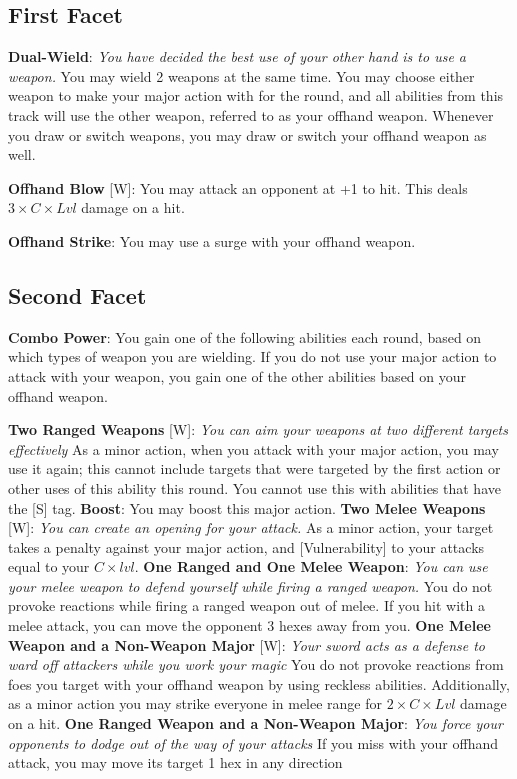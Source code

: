 \begin{multicols*}{2}
\subsection*{First Facet\perk}
\textbf{Dual-Wield}: \emph{You have decided the best use of your other hand is to use a weapon.} You may wield 2 weapons at the same time. You may choose either weapon to make your major action with for the round, and all abilities from this track will use the other weapon, referred to as your offhand weapon.  Whenever you draw or switch weapons, you may draw or switch your offhand weapon as well.

\textbf{Offhand Blow} [W]:  You may attack an opponent at +1 to hit. This deals $3\times C\times Lvl$ damage on a hit.

\textbf{Offhand Strike}: You may use a surge with your offhand weapon. 

\subsection*{Second Facet}
\textbf{Combo Power}: You gain one of the following abilities each round, based on which types of weapon you are wielding. If you do not use your major action to attack with your weapon, you gain one of the other abilities based on your offhand weapon.
\begin{itemize}
\thing \textbf{Two Ranged Weapons} [W]: \emph{You can aim your weapons at two different targets effectively} As a minor action, when you attack with your major action, you may use it again; this cannot include targets that were targeted by the first action or other uses of this ability this round. You cannot use this with abilities that have the [S] tag. \textbf{Boost}: You may boost this major action.
\thing \textbf{Two Melee Weapons} [W]: \emph{You can create an opening for your attack.} As a minor action, your target takes a penalty against your major action, and [Vulnerability] to your attacks equal to your $C \times lvl$.
\thing \textbf{One Ranged and One Melee Weapon}: \emph{You can use your melee weapon to defend yourself while firing a ranged weapon.} You do not provoke reactions while firing a ranged weapon out of melee. If you hit with a melee attack, you can move the opponent 3 hexes away from you.
\thing \textbf{One Melee Weapon and a Non-Weapon Major} [W]: \emph{Your sword acts as a defense to ward off attackers while you work your magic} You do not provoke reactions from foes you target with your offhand weapon by using reckless abilities. Additionally, as a minor action you may strike everyone in melee range for $2\times C\times Lvl$ damage on a hit.
\thing \textbf{One Ranged Weapon and a Non-Weapon Major}: \emph{You force your opponents to dodge out of the way of your attacks} If you miss with your offhand attack, you may move its target 1 hex in any direction
\end{itemize}


\end{multicols*}
